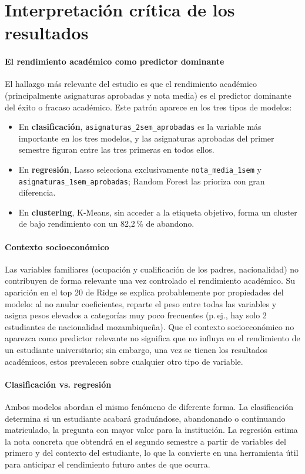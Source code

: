 \documentclass[11pt,letterpaper]{article}
\newcommand{\code}[1]{\texttt{#1}}
\begin{document}
\section{Interpretación crítica de los resultados}

\paragraph{El rendimiento académico como predictor dominante}
El hallazgo más relevante del estudio es que el rendimiento académico (principalmente asignaturas aprobadas y nota media) es el predictor dominante del éxito o fracaso académico. Este patrón aparece en los tres tipos de modelos:
\begin{itemize}
\item En \textbf{clasificación}, \code{asignaturas\_2sem\_aprobadas} es la variable más importante en los tres modelos, y las asignaturas aprobadas del primer semestre figuran entre las tres primeras en todos ellos.
\item En \textbf{regresión}, Lasso selecciona exclusivamente \code{nota\_media\_1sem} y \code{asignaturas\_1sem\_aprobadas}; Random Forest las prioriza con gran diferencia.
\item En \textbf{clustering}, K-Means, sin acceder a la etiqueta objetivo, forma un cluster de bajo rendimiento con un 82,2\,\% de abandono.
\end{itemize}

\paragraph{Contexto socioeconómico}
Las variables familiares (ocupación y cualificación de los padres, nacionalidad) no contribuyen de forma relevante una vez controlado el rendimiento académico. Su aparición en el top 20 de Ridge se explica probablemente por propiedades del modelo: al no anular coeficientes, reparte el peso entre todas las variables y asigna pesos elevados a categorías muy poco frecuentes (p.\,ej., hay solo 2 estudiantes de nacionalidad mozambiqueña). Que el contexto socioeconómico no aparezca como predictor relevante no significa que no influya en el rendimiento de un estudiante universitario; sin embargo, una vez se tienen los resultados académicos, estos prevalecen sobre cualquier otro tipo de variable.

\paragraph{Clasificación vs. regresión}
Ambos modelos abordan el mismo fenómeno de diferente forma. La clasificación determina si un estudiante acabará graduándose, abandonando o continuando matriculado, la pregunta con mayor valor para la institución. La regresión estima la nota concreta que obtendrá en el segundo semestre a partir de variables del primero y del contexto del estudiante, lo que la convierte en una herramienta útil para anticipar el rendimiento futuro antes de que ocurra.
\end{document}

